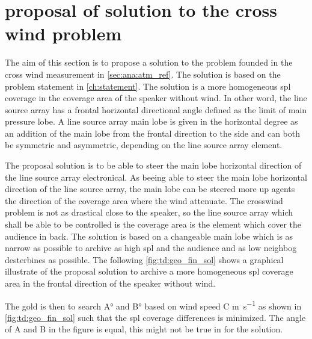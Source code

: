 \section{proposal of solution to the cross wind problem}\label{sec:td:pro_sol_pro}

The aim of this section is to propose a solution to the problem founded in the cross wind measurement in \autoref{sec:ana:atm_ref}. The solution is based on the problem statement in \autoref{ch:statement}. The solution is a more homogeneous \gls{spl} coverage in the coverage area of the speaker without wind. In other word, the line source array has a frontal horizontal directional angle defined as the  limit of main pressure lobe. A line source array main lobe is given in the horizontal degree as an addition of the main lobe from the frontal direction to the side  and can both be symmetric and asymmetric, depending on the line source array element.

The proposal solution is to be able to steer the main lobe horizontal direction of the line source array electronical. As beeing able to steer the main lobe horizontal direction of the line source array, the main lobe can be steered more up agents the direction of the coverage area where the wind attenuate.  The crosswind problem is not as drastical close to the speaker, so the line source array which shall be able to be controlled is the coverage area is the element which cover the audience in back. The solution is based on a changeable main lobe which is as narrow as possible to archive as high \gls{spl} and the audience and as low neighbog desterbines as possible. The following \autoref{fig:td:geo_fin_sol} shows a graphical illustrate of the proposal solution to archive a more homogeneous \gls{spl} coverage area in the frontal direction of the speaker without wind.


The gold is then to search A\si{\degree} and B\si{\degree} based on wind speed C \si{\meter\per\second} as shown in \autoref{fig:td:geo_fin_sol} such that the \gls{spl} coverage differences is minimized. The angle of A and B in the figure is equal, this might not be true in for the solution.

